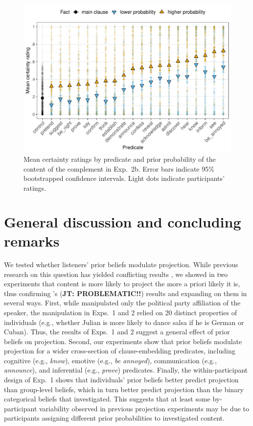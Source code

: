 \documentclass[OpenMind]{stjour}
\begin{document}
\begin{figure}[h!]
\centering

\includegraphics[width=\textwidth]{../../results/3-projectivity/graphs/means-projectivity-by-predicate-and-prior}

\caption{Mean certainty ratings by predicate and prior probability of the content of the complement in Exp.~2b. Error bars indicate 95\% bootstrapped confidence intervals. Light dots indicate participants' ratings.} 
\label{f-projection-mean-2b}
\end{figure}

\section{General discussion and concluding remarks}
\label{s4}


We tested whether listeners' prior beliefs modulate projection. While previous research on this question has yielded conflicting results \citep{mahler2020, lorson2018}, we showed in two experiments that content is more likely to project the more a priori likely it is, thus confirming \citet{mahler2020}'s ({\bf JT: PROBLEMATIC!!}) results and expanding on them in several ways. First, while \citet{mahler2020} manipulated only the political party affiliation of the speaker, the manipulation in Exps.~1 and 2 relied on 20 distinct properties of individuals (e.g., whether Julian is more likely to dance salsa if he is German or Cuban). Thus, the results of Exps.~1 and 2 suggest a general effect of prior beliefs on projection. Second, our experiments show that prior beliefs modulate projection for a wider cross-section of clause-embedding predicates, including cognitive (e.g., {\em know}), emotive (e.g., {\em be annoyed}), communication (e.g., {\em announce}), and inferential (e.g., {\em prove}) predicates. Finally, the within-participant design of Exp.~1 shows that individuals' prior beliefs better predict projection than group-level beliefs, which in turn better predict projection than the binary categorical beliefs that \citet{mahler2020} investigated. This suggests that at least some by-participant variability observed in previous projection experiments  \citep[see, e.g.,][]{tbd-variability,tonhauser-degen-factive} may be due to participants assigning different prior probabilities to investigated content.
\end{document}
